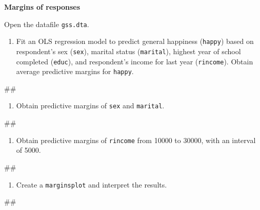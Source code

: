 \documentclass[
]{book}
\newenvironment{Shaded}{\begin{snugshade}}{\end{snugshade}}
\newcommand{\NormalTok}[1]{#1}
\providecommand{\tightlist}{%
  \setlength{\itemsep}{0pt}\setlength{\parskip}{0pt}}
\begin{document}
\textbf{Margins of responses}

Open the datafile \texttt{gss.dta}.

\begin{enumerate}
\def\labelenumi{\arabic{enumi}.}
\tightlist
\item
  Fit an OLS regression model to predict general happiness (\texttt{happy}) based on respondent's sex (\texttt{sex}), marital status (\texttt{marital}), highest year of school completed (\texttt{educ}), and respondent's income for last year (\texttt{rincome}). Obtain average predictive margins for \texttt{happy}.
\end{enumerate}

\begin{Shaded}
\begin{Highlighting}[]
\NormalTok{\#\#}
\end{Highlighting}
\end{Shaded}

\begin{enumerate}
\def\labelenumi{\arabic{enumi}.}
\setcounter{enumi}{1}
\tightlist
\item
  Obtain predictive margins of \texttt{sex} and \texttt{marital}.
\end{enumerate}

\begin{Shaded}
\begin{Highlighting}[]
\NormalTok{\#\#}
\end{Highlighting}
\end{Shaded}

\begin{enumerate}
\def\labelenumi{\arabic{enumi}.}
\setcounter{enumi}{2}
\tightlist
\item
  Obtain predictive margins of \texttt{rincome} from 10000 to 30000, with an interval of 5000.
\end{enumerate}

\begin{Shaded}
\begin{Highlighting}[]
\NormalTok{\#\#}
\end{Highlighting}
\end{Shaded}

\begin{enumerate}
\def\labelenumi{\arabic{enumi}.}
\setcounter{enumi}{3}
\tightlist
\item
  Create a \texttt{marginsplot} and interpret the results.
\end{enumerate}

\begin{Shaded}
\begin{Highlighting}[]
\NormalTok{\#\# }
\end{Highlighting}
\end{Shaded}
\end{document}
